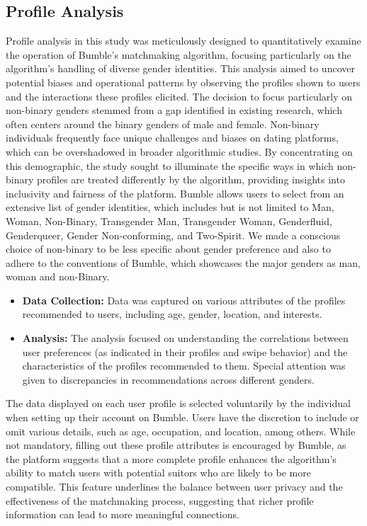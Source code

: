 \subsection{Profile Analysis}
Profile analysis in this study was meticulously designed to quantitatively examine the operation of Bumble’s matchmaking algorithm, focusing particularly on the algorithm's handling of diverse gender identities. This analysis aimed to uncover potential biases and operational patterns by observing the profiles shown to users and the interactions these profiles elicited. The decision to focus particularly on non-binary genders stemmed from a gap identified in existing research, which often centers around the binary genders of male and female. Non-binary individuals frequently face unique challenges and biases on dating platforms, which can be overshadowed in broader algorithmic studies. By concentrating on this demographic, the study sought to illuminate the specific ways in which non-binary profiles are treated differently by the algorithm, providing insights into inclusivity and fairness of the platform. Bumble allows users to select from an extensive list of gender identities, which includes but is not limited to Man, Woman, Non-Binary, Transgender Man, Transgender Woman, Genderfluid, Genderqueer, Gender Non-conforming, and Two-Spirit. We made a conscious choice of non-binary to be less specific about gender preference and also to adhere to the conventions of  Bumble, which showcases the major genders as man, woman and non-Binary. 

\begin{itemize}
    \item \textbf{Data Collection:} Data was captured on various attributes of the profiles recommended to users, including age, gender, location, and interests.
    \item \textbf{Analysis:} The analysis focused on understanding the correlations between user preferences (as indicated in their profiles and swipe behavior) and the characteristics of the profiles recommended to them. Special attention was given to discrepancies in recommendations across different genders.
\end{itemize}

The data displayed on each user profile is selected voluntarily by the individual when setting up their account on Bumble. Users have the discretion to include or omit various details, such as age, occupation, and location, among others. While not mandatory, filling out these profile attributes is encouraged by Bumble, as the platform suggests that a more complete profile enhances the algorithm's ability to match users with potential suitors who are likely to be more compatible. This feature underlines the balance between user privacy and the effectiveness of the matchmaking process, suggesting that richer profile information can lead to more meaningful connections.

